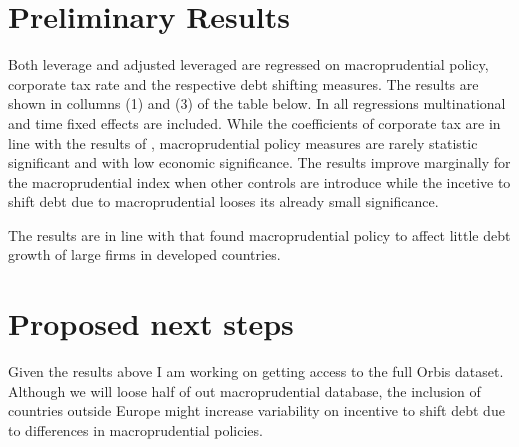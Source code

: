 \documentclass[12pt,runningheads]{article}
\begin{document}
\break

\section{Preliminary Results}
Both leverage and adjusted leveraged are regressed on macroprudential policy, corporate tax rate and the respective debt shifting measures. The results are shown in collumns (1) and (3) of the table below. In all regressions multinational and time fixed effects are included. While the coefficients of corporate tax are in line with the results of \cite{huizinga2008capital}, macroprudential policy measures are rarely statistic significant and with low economic significance. The results improve marginally for the macroprudential index when other controls are introduce while the incetive to shift debt due to macroprudential looses its already small significance. 

The results are in line with \cite{beck2004bank} that found macroprudential policy to affect little debt growth of large firms in developed countries. 
\begin{figure}	
\scalebox{0.75}{}
\end{figure}

\section{Proposed next steps}
Given the results above I am working on getting access to the full Orbis dataset. Although we will loose half of out macroprudential database, the inclusion of countries outside Europe might increase variability on incentive to shift debt due to differences in macroprudential policies.


\end{document}
